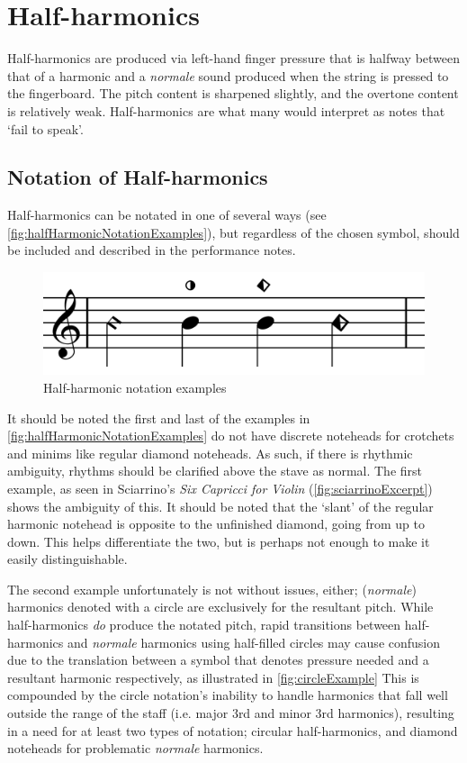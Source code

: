 \section{Half-harmonics} \label{sec:half-harmonics}
Half-harmonics are produced via left-hand finger pressure that is halfway between that of a harmonic and a \emph{normale} sound produced when the string is pressed to the fingerboard.\autocite[]{}
The pitch content is sharpened slightly, and the overtone content is relatively weak.\autocite[113]{welbanksFoundationsModernCello}
Half-harmonics are what many would interpret as notes that `fail to speak'.

\subsection{Notation of Half-harmonics} \label{sec:notation-half-harmonics}
Half-harmonics can be notated in one of several ways (see \autoref{fig:halfHarmonicNotationExamples}), but regardless of the chosen symbol, should be included and described in the performance notes.


\begin{figure}
    \includegraphics[width=\linewidth]{./resources/halfHarmonicNotationExamples.pdf}
    \caption{Half-harmonic notation examples} \label{fig:halfHarmonicNotationExamples}
  \end{figure}

It should be noted the first and last of the examples in \autoref{fig:halfHarmonicNotationExamples} do not have discrete noteheads for crotchets and minims like regular diamond noteheads.
As such, if there is rhythmic ambiguity, rhythms should be clarified above the stave as normal.
The first example, as seen in Sciarrino's \emph{Six Capricci for Violin} (\autoref{fig:sciarrinoExcerpt}) shows the ambiguity of this.
It should be noted that the `slant' of the regular harmonic notehead is opposite to the unfinished diamond, going from up to down.
This helps differentiate the two, but is perhaps not enough to make it easily distinguishable.

The second example unfortunately is not without issues, either; (\emph{normale}) harmonics denoted with a circle are exclusively for the resultant pitch.\autocite[419]{gouldBars2011} 
While half-harmonics \emph{do} produce the notated pitch, rapid transitions between half-harmonics and \emph{normale} harmonics using half-filled circles may cause confusion due to the translation between a symbol that denotes pressure needed and a resultant harmonic respectively, as illustrated in \autoref{fig:circleExample}
This is compounded by the circle notation's inability to handle harmonics that fall well outside the range of the staff (i.e. major 3rd and minor 3rd harmonics), resulting in a need for at least two types of notation; circular half-harmonics, and diamond noteheads for problematic \emph{normale} harmonics.

